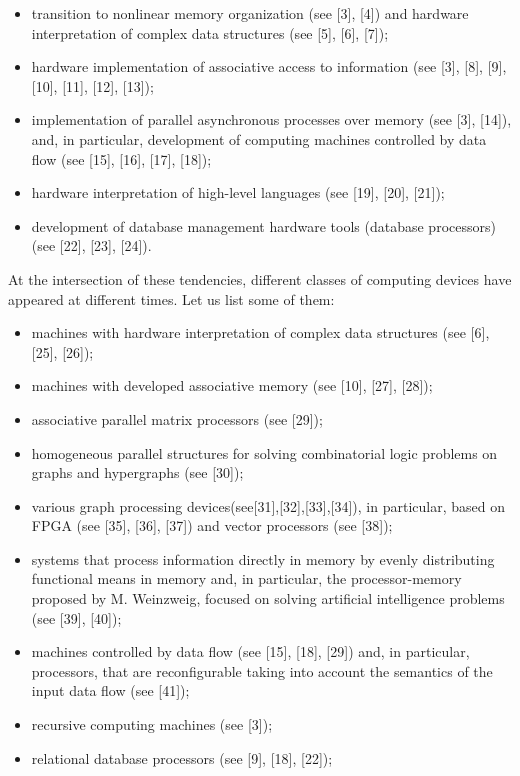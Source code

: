 \documentclass{article}
\begin{document}
\begin{multicols}{2}
\begin{itemize}
    \item transition to nonlinear memory organization (see [3], [4]) and hardware interpretation of complex data structures (see [5], [6], [7]);
    \item hardware implementation of associative access to information (see [3], [8], [9], [10], [11], [12], [13]);
    \item implementation of parallel asynchronous processes over memory (see [3], [14]), and, in particular, development of computing machines controlled by data flow (see [15], [16], [17], [18]);
    \item hardware interpretation of high-level languages (see [19], [20], [21]);
    \item development of database management hardware tools (database processors) (see [22], [23], [24]).
\end{itemize}
\par At the intersection of these tendencies, different classes of computing devices have appeared at different times. Let us list some of them:
\begin{itemize}
    \item machines with hardware interpretation of complex data structures (see [6], [25], [26]);
    \item machines with developed associative memory (see [10], [27], [28]);
    \item associative parallel matrix processors (see [29]);
    \item homogeneous parallel structures for solving combinatorial logic problems on graphs and hypergraphs (see [30]);
    \item various graph processing devices(see[31],[32],[33],[34]), in particular, based on FPGA (see [35], [36], [37]) and vector processors (see [38]);
    \item systems that process information directly in memory by evenly distributing functional means in memory and, in particular, the processor-memory proposed by M. Weinzweig, focused on solving artificial intelligence problems (see [39], [40]);
    \item machines controlled by data flow (see [15], [18], [29]) and, in particular, processors, that are reconfigurable taking into account the semantics of the input data flow (see [41]);
    \item recursive computing machines (see [3]);
    \item relational database processors (see [9], [18], [22]);

\end{itemize}
\end{multicols}
\end{document}

